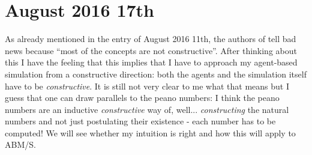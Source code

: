 \section*{August 2016 17th}
As already mentioned in the entry of August 2016 11th, the authors of \cite{Ionescu2013} tell bad news because \enquote{most of the concepts are not constructive}. After thinking about this I have the feeling that this implies that I have to approach my agent-based simulation from a constructive direction: both the agents and the simulation itself have to be \textit{constructive}. It is still not very clear to me what that means but I guess that one can draw parallels to the peano numbers: I think the peano numbers are an inductive \textit{constructive} way of, well... \textit{constructing} the natural numbers and not just postulating their existence - each number has to be computed! We will see whether my intuition is right and how this will apply to ABM/S.